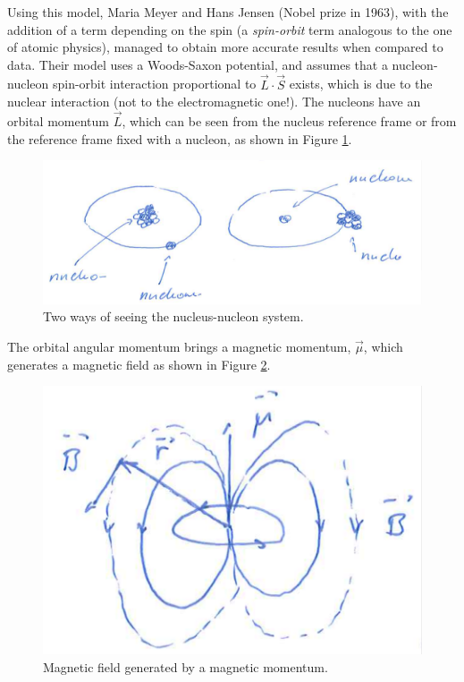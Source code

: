 Using this model, Maria Meyer and Hans Jensen (Nobel prize in 1963), with the addition of a term depending on the spin (a \emph{spin-orbit} term analogous to the one of atomic physics), managed to obtain more accurate results when compared to data. Their model uses a Woods-Saxon potential, and assumes that a nucleon-nucleon spin-orbit interaction proportional to \(\Vec{L}\cdot\Vec{S}\) exists, which is due to the nuclear interaction (not to the electromagnetic one!). The nucleons have an orbital momentum $\Vec{L}$, which can be seen from the nucleus reference frame or from the reference frame fixed with a nucleon, as shown in Figure \ref{nuclear-physics-fig:13}.
\begin{figure}[h]
    \centering
    \includegraphics[scale=0.4]{Figures/nuclear-physics-fig13}
    \caption{Two ways of seeing the nucleus-nucleon system.}
    \label{nuclear-physics-fig:13}
\end{figure}
The orbital angular momentum brings a magnetic momentum, $\Vec{\mu}$, which generates a magnetic field as shown in Figure \ref{nuclear-physics-fig:14}.
\begin{figure}[h]
    \centering
    \includegraphics[scale=0.4]{Figures/nuclear-physics-fig14}
    \caption{Magnetic field generated by a magnetic momentum.}
    \label{nuclear-physics-fig:14}
\end{figure}

